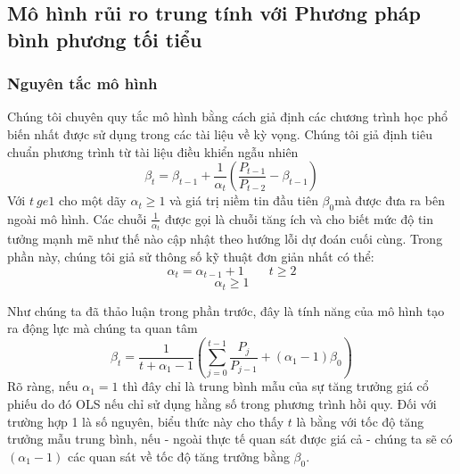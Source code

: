 \documentclass[10pt,a4paper]{article}
\begin{document}
	\subsection{Mô hình rủi ro trung tính với Phương pháp bình phương tối tiểu}
	\subsubsection{Nguyên tắc mô hình}
	Chúng tôi chuyên quy tắc mô hình bằng cách giả định các chương trình học phổ biến nhất
	được sử dụng trong các tài liệu về kỳ vọng. Chúng tôi giả định tiêu chuẩn phương trình từ tài liệu điều khiển ngẫu nhiên
	\begin{equation}
	\beta_t=\beta_{t-1}+\frac{1}{\alpha_t}\left(\frac{P_{t-1}}{P_{t-2}}-\beta_{t-1}\right)
	\end{equation}
	Với $t\ ge 1$ cho một dãy $\alpha_t\ge 1$ và giá trị niềm tin đầu tiên $\beta_0$mà
	được đưa ra bên ngoài mô hình. Các chuỗi $\frac{1}{\alpha_t}$ được gọi là chuỗi tăng ích và cho biết mức độ tin tưởng mạnh mẽ như thế nào cập nhật theo hướng lỗi dự đoán cuối cùng. Trong phần này, chúng tôi giả sử thông số kỹ thuật đơn giản nhất có thể:
	\begin{equation}
	\alpha_t=\alpha_{t-1}+1\qquad t\ge 2
	\end{equation}
	$$\alpha_t\ge 1$$
	
	Như chúng ta đã thảo luận trong phần trước, đây là tính năng của mô hình
	tạo ra động lực mà chúng ta quan tâm
	$$\beta_t=\frac{1}{t+\alpha_{1}-1}\left(\sum_{j=0}^{t-1}\frac{P_j}{P_{j-1}}+(\alpha_{1}-1)\beta_0\right)$$
	Rõ ràng, nếu $\alpha_1 = 1$ thì đây chỉ là trung bình mẫu của sự tăng trưởng giá cổ phiếu
	do đó OLS nếu chỉ sử dụng hằng số trong phương trình hồi quy. Đối với trường hợp 1 là số nguyên, biểu thức này cho thấy $t$ là bằng với tốc độ tăng trưởng mẫu trung bình, nếu - ngoài thực tế quan sát được giá cả - chúng ta sẽ có$(\alpha_1 -1)$ các quan sát về tốc độ tăng trưởng bằng $\beta_0$. 
	
\end{document}
